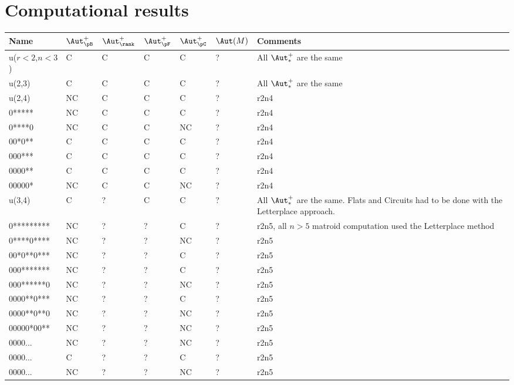 
\appendix
\section{Computational results}
\begin{center}
    \small
    \begin{tabular}{ | l | l | l | l | l | l |p{2.5cm} |}
    \hline
    Name  & $\Aut_{\pB}^+$ &  $\Aut_{\rank}^+$  & $\Aut_{\pF}^+$ & $\Aut_{\pC}^+$ & $\Aut(M)$ & Comments \\ \hline
     u($r<2$,$n<3$) &  C & C & C & C & ? &All $\Aut_{*}^+$ are the same  \\ \hline
    u(2,3) &  C & C & C & C &  ? &All $\Aut_{*}^+$ are the same  \\ \hline
    u(2,4) &  NC &  C & C & C &  ? & r2n4 \\ \hline
    0***** &  NC &  C & C & C &  ? & r2n4 \\ \hline
    0****0 &  NC &  C & C & NC & ? & r2n4 \\ \hline
    00*0** & C &  C & C & C & ? & r2n4  \\ \hline
    000*** & C &  C & C & C &  ? &r2n4  \\ \hline
    0000** & C &  C & C & C & ? & r2n4 \\ \hline
    00000* & NC &  C & C & NC &  ? &r2n4 \\ \hline
    u(3,4) &  C &  ? & C & C &   ? &All $\Aut_{*}^+$ are the same. Flats and Circuits had to be done with the Letterplace approach. \\ \hline
     0********* & NC &  ? & ? & C & ? & r2n5, all $n>5$ matroid computation used the Letterplace method \\ \hline
     0****0**** & NC &  ? & ? & NC &  ? &r2n5 \\ \hline
     00*0**0*** & NC &  ? & ? & C &  ? &r2n5 \\ \hline
     000******* & NC &  ? & ? & C & ? & r2n5 \\ \hline
     000******0 & NC &  ? & ? & NC & ? & r2n5 \\ \hline
     0000**0*** & NC &  ? & ? & C & ? & r2n5 \\ \hline
     0000**0**0 & NC &  ? & ? & NC & ? & r2n5 \\ \hline
     00000*00** & NC &  ? & ? & NC & ? & r2n5 \\ \hline
     0000... & NC &  ? & ? & NC & ? & r2n5 \\ \hline
     0000... & C &  ? & ? & C & ? & r2n5 \\ \hline
     0000...& NC &  ? & ? & NC &  ? &r2n5 \\ \hline

\end{tabular}
\end{center}

